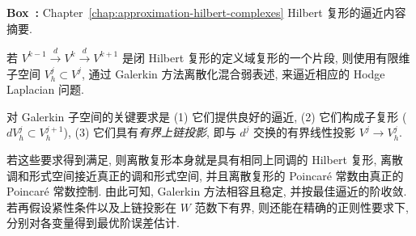 \begin{tcolorbox}[enhanced,breakable,colback=KuangNei,frame hidden,boxrule=0pt,sharpish corners,before skip=10pt,after skip=10pt]
\label{box:approximation-hilbert-summary}
\noindent\textbf{Box~\thebooksummary:} {Chapter~\ref{chap:approximation-hilbert-complexes} Hilbert 复形的逼近内容摘要.}\par

{若 $V^{k-1}\xrightarrow{d}V^k\xrightarrow{d}V^{k+1}$ 是闭 Hilbert 复形的定义域复形的一个片段, 则使用有限维子空间 $V_h^j\subset V^j$, 通过 Galerkin 方法离散化混合弱表述, 来逼近相应的 Hodge Laplacian 问题.}

{对 Galerkin 子空间的关键要求是 (1) 它们提供良好的逼近, (2) 它们构成子复形 ($dV_h^j\subset V_h^{j+1}$), (3) 它们具有\emph{有界上链投影}, 即与 $d^j$ 交换的有界线性投影 $V^j\to V_h^j$.}

{若这些要求得到满足, 则离散复形本身就是具有相同上同调的 Hilbert 复形, 离散调和形式空间接近真正的调和形式空间, 并且离散复形的 Poincaré 常数由真正的 Poincaré 常数控制. 由此可知, Galerkin 方法相容且稳定, 并按最佳逼近的阶收敛. 若再假设紧性条件以及上链投影在 $W$ 范数下有界, 则还能在精确的正则性要求下, 分别对各变量得到最优阶误差估计.}
\end{tcolorbox}

